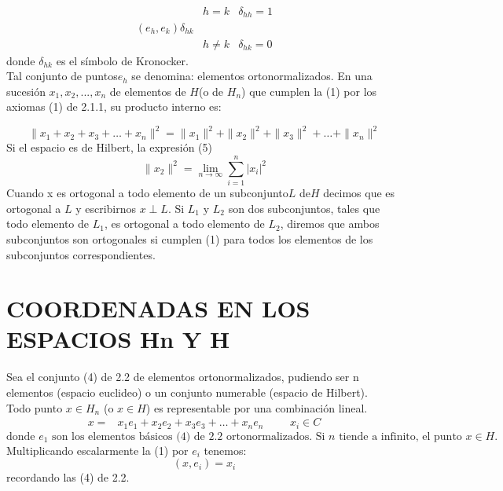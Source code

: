	\begin{equation}
		\begin{array}{lccl}
				& h = k            & \delta_{hh} = 1\\
				(e_{h}, e_{k}) \delta_{hk}   \\
				&  h \not = k  & \delta_{hk} = 0        
		\end{array}	 
	\end{equation}
	donde $ \delta_{hk} $ es el símbolo de Kronocker.\\
	Tal conjunto de puntos$  e_{h} $ se denomina: elementos ortonormalizados.
	En una sucesión $ x_{1}, x_{2}, ..., x_{n} $ de elementos de $ H $(o de $ H_{n} $) que cumplen la (1) por los axiomas (1) de 2.1.1, su producto interno es:
	
	\begin{equation}
		\parallel x_{1}+x_{2}+x_{3}+\ldots+x_{n} \parallel^{2}  = 	\parallel x_{1} \parallel^{2}+\parallel x_{2} \parallel^{2}+\parallel x_{3} \parallel^{2}+\ldots+\parallel x_{n} \parallel^{2}
	\end{equation}
	Si el espacio es de Hilbert, la expresión (5) \\
	\begin{equation}
		\parallel x_{2} \parallel^{2} = \lim\limits_{n \rightarrow \infty} \sum_{i = 1}^{n} |x_{i}|^{2}
	\end{equation}
	Cuando x es ortogonal a todo elemento de un subconjunto$ L $ de$ H $ decimos que es ortogonal a $L$ y escribirnos $x \perp L$. Si $ L_{1} $ y $ L_{2} $ son dos subconjuntos, tales que todo elemento de $ L_{1} $, es ortogonal a todo elemento de $ L_{2} $, diremos que ambos subconjuntos son ortogonales si cumplen (1) para todos los elementos de los subconjuntos correspondientes.
	
\section{COORDENADAS EN LOS ESPACIOS Hn Y H}

Sea el conjunto (4) de 2.2 de elementos ortonormalizados, pudiendo ser n elementos (espacio euclideo) o un conjunto numerable (espacio de Hilbert).\\

Todo punto $ x \in H_{n} $ (o $x \in H$) es representable por una combinación lineal.
	\setcounter{equation}{0}%
\begin{equation}
		\begin{array}{lcccl}
		x = & x_{1}e_{1}+x_{2}e_{2}+x_{3}e_{3}+\ldots+x_{n}e_{n} & & & x_{i} \in C
		\end{array}
\end{equation}
\begin{equation}
\text{donde } e_{1}  \text{ son los elementos básicos (4) de 2.2 ortonormalizados. } \text{Si } n \text{ tiende a infinito, el punto } x \in H.
\end{equation}
Multiplicando escalarmente la (1) por $ e_{i} $ tenemos:
\begin{equation}
(x, e_{i}) = x_{i}
\end{equation}
recordando las (4) de 2.2.\\

